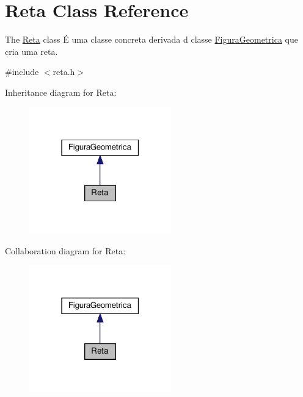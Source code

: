 \hypertarget{class_reta}{}\section{Reta Class Reference}
\label{class_reta}


The \hyperlink{class_reta}{Reta} class É uma classe concreta derivada d classe \hyperlink{class_figura_geometrica}{Figura\+Geometrica} que cria uma reta.  




{\ttfamily \#include $<$reta.\+h$>$}



Inheritance diagram for Reta\+:
\nopagebreak
\begin{figure}[H]
\begin{center}
\leavevmode
\includegraphics[width=174pt]{class_reta__inherit__graph}
\end{center}
\end{figure}


Collaboration diagram for Reta\+:
\nopagebreak
\begin{figure}[H]
\begin{center}
\leavevmode
\includegraphics[width=174pt]{class_reta__coll__graph}
\end{center}
\end{figure}
